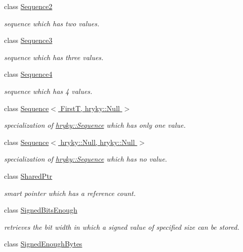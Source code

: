 \begin{DoxyCompactItemize}
class \hyperlink{classhryky_1_1_sequence2}{Sequence2}
\begin{DoxyCompactList}\small\item\em sequence which has two values. \end{DoxyCompactList}\item 
class \hyperlink{classhryky_1_1_sequence3}{Sequence3}
\begin{DoxyCompactList}\small\item\em sequence which has three values. \end{DoxyCompactList}\item 
class \hyperlink{classhryky_1_1_sequence4}{Sequence4}
\begin{DoxyCompactList}\small\item\em sequence which has 4 values. \end{DoxyCompactList}\item 
class \hyperlink{classhryky_1_1_sequence_3_01_first_t_00_01hryky_1_1_null_01_4}{Sequence$<$ First\-T, hryky\-::\-Null $>$}
\begin{DoxyCompactList}\small\item\em specialization of \hyperlink{classhryky_1_1_sequence}{hryky\-::\-Sequence} which has only one value. \end{DoxyCompactList}\item 
class \hyperlink{classhryky_1_1_sequence_3_01hryky_1_1_null_00_01hryky_1_1_null_01_4}{Sequence$<$ hryky\-::\-Null, hryky\-::\-Null $>$}
\begin{DoxyCompactList}\small\item\em specialization of \hyperlink{classhryky_1_1_sequence}{hryky\-::\-Sequence} which has no value. \end{DoxyCompactList}\item 
class \hyperlink{classhryky_1_1_shared_ptr}{Shared\-Ptr}
\begin{DoxyCompactList}\small\item\em smart pointer which has a reference count. \end{DoxyCompactList}\item 
class \hyperlink{classhryky_1_1_signed_bits_enough}{Signed\-Bits\-Enough}
\begin{DoxyCompactList}\small\item\em retrieves the bit width in which a signed value of specified size can be stored. \end{DoxyCompactList}\item 
class \hyperlink{classhryky_1_1_signed_enough_bytes}{Signed\-Enough\-Bytes}

\end{DoxyCompactItemize}
